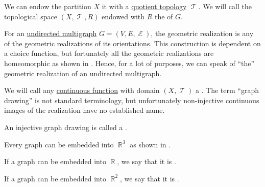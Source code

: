 \begin{definition}
  We can endow the partition \( X \) it with a \hyperref[def:topological_quotient]{quotient topology} \( \mscrT \). We will call the topological space \( (X, \mscrT, R) \) endowed with \( R \) the  of \( G \).

  \begin{thmenum}
     For an \hyperref[def:undirected_multigraph]{undirected multigraph} \( G = (V, E, \mscrE) \), the geometric realization is any of the geometric realizations of its \hyperref[def:multigraph_orientation]{orientations}. This construction is dependent on a choice function, but fortunately all the geometric realizations are homeomorphic as shown in . Hence, for a lot of purposes, we can speak of \enquote{the} geometric realization of an undirected multigraph.

     We will call any \hyperref[def:global_continuity]{continuous function} with domain \( (X, \mscrT) \) a . The term \enquote{graph drawing} is not standard terminology, but unfortunately non-injective continuous images of the realization have no established name.

     An injective graph drawing is called a .

    Every graph can be embedded into \( \BbbR^3 \) as shown in .

     If a graph can be embedded into \( \BbbR \), we say that it is .

     If a graph can be embedded into \( \BbbR^2 \), we say that it is .
  \end{thmenum}
\end{definition}

